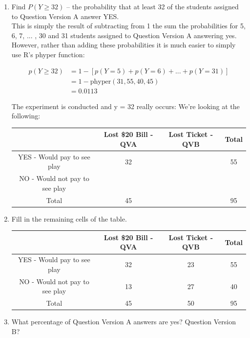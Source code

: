 \documentclass{scrartcl}
\begin{document}
\begin{enumerate}
\item Find $P(Y \ge 32)$ – the probability that at least 32 of the students assigned to Question Version A answer YES.\\

  This is simply the result of subtracting from 1 the sum the probabilities for 5, 6, 7, ... , 30 and 31 students assigned to Question Version A answering yes. However, rather than adding these probabilities it is much easier to simply use R's phyper function:

\begin{align*}
  p(Y \ge 32) &= 1 - \left[p(Y = 5) + p(Y = 6) + ... + p(Y = 31)\right]\\
  &= 1 - \text{phyper}(31,55,40,45)\\
  &= 0.0113
\end{align*}
\pagebreak

The experiment is conducted and y = 32 really occurs: We’re looking at the following:

\begin{center}
\begin{tabular} { |c|c c|c| }
\hline
&Lost \$20 Bill -  QVA & Lost Ticket - QVB & Total\\
\hline
YES - Would pay to see play & 32 & & 55\\
NO - Would not pay to see play && &\\
\hline
Total & 45 && 95\\
\hline
\end{tabular}
\end{center}

\item Fill in the remaining cells of the table.

\begin{center}
\begin{tabular} { |c|c c|c| }
\hline
&Lost \$20 Bill -  QVA & Lost Ticket - QVB & Total\\
\hline
YES - Would pay to see play & 32 & 23 & 55\\
NO - Would not pay to see play & 13 & 27 & 40\\
\hline
Total & 45 & 50 & 95\\
\hline
\end{tabular}
\end{center}

\item What percentage of Question Version A answers are yes? Question Version B?\\


\end{enumerate}
\end{document}
